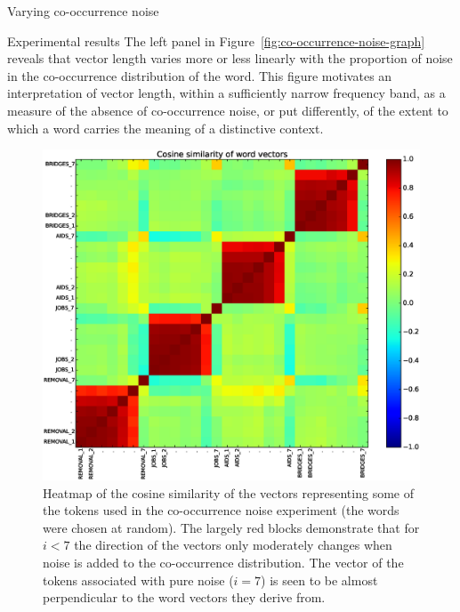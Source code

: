 \documentclass{article} %
\begin{document}
\begin{section}{Varying co-occurrence noise}
\begin{subsection}{Experimental results}
The left panel in Figure~\ref{fig:co-occurrence-noise-graph} reveals
that vector length varies more or less linearly with the proportion of
noise in the co-occurrence distribution of the word.  This figure
motivates an interpretation of vector length, within a sufficiently
narrow frequency band, as a measure of the absence of co-occurrence
noise, or put differently, of the extent to which a word carries the
meaning of a distinctive context.


\begin{figure}
	\includegraphics[scale=0.5]{cooccurrence-noise-heatmap}
	\caption{ Heatmap of the cosine similarity of the vectors
          representing some of the tokens used in the co-occurrence
          noise experiment (the words were chosen at random).  The
          largely red blocks demonstrate that for $i<7$ the direction of
          the vectors only moderately changes when noise is added to the
          co-occurrence distribution.  The vector of the tokens
          associated with pure noise ($i=7$) is seen to be almost
          perpendicular to the word vectors they derive from. }
	\label{fig:co-occurrence-noise-heatmap}
\end{figure}


\end{subsection}
\end{section}
\end{document}
